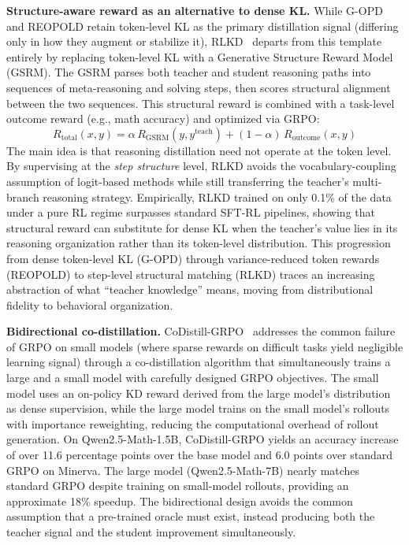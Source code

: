\documentclass{article} %
\begin{document}
\textbf{Structure-aware reward as an alternative to dense KL.} While G-OPD and REOPOLD retain token-level KL as the primary distillation signal (differing only in how they augment or stabilize it), RLKD~\citep{2505.16142} departs from this template entirely by replacing token-level KL with a Generative Structure Reward Model (GSRM). The GSRM parses both teacher and student reasoning paths into sequences of meta-reasoning and solving steps, then scores structural alignment between the two sequences. This structural reward is combined with a task-level outcome reward (e.g., math accuracy) and optimized via GRPO:
\begin{equation}
    R_{\text{total}}(x, y) = \alpha \, R_{\text{GSRM}}(y, y^{\text{teach}}) + (1-\alpha) \, R_{\text{outcome}}(x, y)
\end{equation}
The main idea is that reasoning distillation need not operate at the token level. By supervising at the \emph{step structure} level, RLKD avoids the vocabulary-coupling assumption of logit-based methods while still transferring the teacher's multi-branch reasoning strategy. Empirically, RLKD trained on only 0.1\% of the data under a pure RL regime surpasses standard SFT-RL pipelines, showing that structural reward can substitute for dense KL when the teacher's value lies in its reasoning organization rather than its token-level distribution. This progression from dense token-level KL (G-OPD) through variance-reduced token rewards (REOPOLD) to step-level structural matching (RLKD) traces an increasing abstraction of what ``teacher knowledge'' means, moving from distributional fidelity to behavioral organization.

\textbf{Bidirectional co-distillation.} CoDistill-GRPO~\citep{2605.08873} addresses the common failure of GRPO on small models (where sparse rewards on difficult tasks yield negligible learning signal) through a co-distillation algorithm that simultaneously trains a large and a small model with carefully designed GRPO objectives. The small model uses an on-policy KD reward derived from the large model's distribution as dense supervision, while the large model trains on the small model's rollouts with importance reweighting, reducing the computational overhead of rollout generation. On Qwen2.5-Math-1.5B, CoDistill-GRPO yields an accuracy increase of over 11.6 percentage points over the base model and 6.0 points over standard GRPO on Minerva. The large model (Qwen2.5-Math-7B) nearly matches standard GRPO despite training on small-model rollouts, providing an approximate 18\% speedup. The bidirectional design avoids the common assumption that a pre-trained oracle must exist, instead producing both the teacher signal and the student improvement simultaneously.
\end{document}
